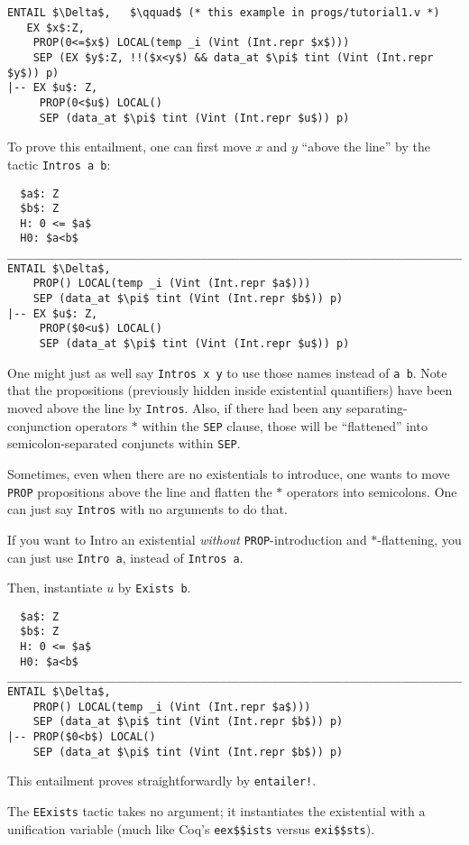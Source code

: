 \documentclass[12pt,fleqn,openany,oneside,showtrims]{memoir}
\begin{document}
\begin{lstlisting}
ENTAIL $\Delta$,   $\qquad$ (* this example in progs/tutorial1.v *)
   EX $x$:Z,
    PROP(0<=$x$) LOCAL(temp _i (Vint (Int.repr $x$)))
    SEP (EX $y$:Z, !!($x<y$) && data_at $\pi$ tint (Vint (Int.repr $y$)) p)
|-- EX $u$: Z,
     PROP(0<$u$) LOCAL()
     SEP (data_at $\pi$ tint (Vint (Int.repr $u$)) p)
\end{lstlisting}
To prove this entailment, one can first move $x$ and $y$ ``above
the line'' by the tactic \lstinline{Intros a b}:
\begin{lstlisting}
  $a$: Z
  $b$: Z
  H: 0 <= $a$
  H0: $a<b$
_______________________________________________________________________________
ENTAIL $\Delta$,
    PROP() LOCAL(temp _i (Vint (Int.repr $a$)))
    SEP (data_at $\pi$ tint (Vint (Int.repr $b$)) p)
|-- EX $u$: Z,
     PROP($0<u$) LOCAL()
     SEP (data_at $\pi$ tint (Vint (Int.repr $u$)) p)
\end{lstlisting}
One might just as well say \lstinline{Intros x y}
to use those names instead of \lstinline{a b}.
Note that the propositions (previously hidden inside
existential quantifiers) have been moved above the line
by \lstinline{Intros}.  Also, if there had been any
separating-conjunction operators $*$ within the \lstinline{SEP}
clause, those will be ``flattened'' into semicolon-separated
conjuncts within \lstinline{SEP}.

Sometimes, even when there are no existentials to introduce,
one wants to move \lstinline{PROP} propositions
above the line and flatten the $*$ operators into semicolons.
One can just say \lstinline{Intros} with no arguments to do that.

If you want to Intro an existential \emph{without}
\lstinline{PROP}-introduction and \linebreak $*$-flattening, you can
just use \lstinline{Intro a}, instead of \lstinline{Intros a}.

Then, instantiate $u$ by \lstinline{Exists b}.
\begin{lstlisting}
  $a$: Z
  $b$: Z
  H: 0 <= $a$
  H0: $a<b$
_______________________________________________________________________________
ENTAIL $\Delta$,
    PROP() LOCAL(temp _i (Vint (Int.repr $a$)))
    SEP (data_at $\pi$ tint (Vint (Int.repr $b$)) p)
|-- PROP($0<b$) LOCAL()
    SEP (data_at $\pi$ tint (Vint (Int.repr $b$)) p)
\end{lstlisting}
This entailment proves straightforwardly by
\lstinline{entailer!}.

The \lstinline{EExists} tactic takes no argument; it instantiates
the existential with a unification variable (much like Coq's
\lstinline{eex$$ists} versus \lstinline{exi$$sts}).
\end{document}
